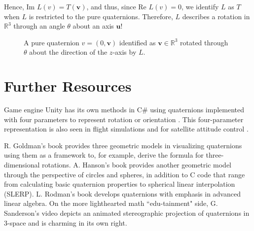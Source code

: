 \documentclass[12pt]{article}
\theoremstyle{plain}
\theoremstyle{definition}
\begin{document}
Hence, Im $L(v) = T(\textbf{v})$, and thus, since Re $L(v)=0$, we identify $L$ as $T$ when $L$ is restricted to the pure quaternions. Therefore, $L$ describes a rotation in $\mathbb{R}^3$ through an angle $\theta$ about an axis $\textbf{u}$!

\begin{figure}[h]
    \centering
    \caption{A pure quaternion $v=(0,\textbf{v})$ identified as $\textbf{v}\in\mathbb{R}^3$ rotated through $\theta$ about the direction of the $z$-axis by $L$.}
    \label{fig:quatRotL}
\end{figure}

\section{Further Resources}
Game engine Unity has its own methods in C\# using quaternions  implemented with four parameters to represent rotation or orientation \cite{unity}. This four-parameter representation is also seen in flight simulations and for satellite attitude control \cite{kristiansen, terze}.

R. Goldman's book \cite{goldman} provides three geometric models in visualizing quaternions using them as a framework to, for example, derive the formula for three-dimensional rotations. A. Hanson's book \cite{hanson} provides another geometric model through the perspective of circles and spheres, in addition to C code that range from calculating basic quaternion properties to spherical linear interpolation (SLERP). L. Rodman's book \cite{rodman} develops quaternions with emphasis in advanced linear algebra. On the more lighthearted math ``edu-tainment" side, G. Sanderson's video \cite{sanderson} depicts an animated stereographic projection of quaternions in 3-space and is charming in its own right. 


\nocite{*}
\printbibliography
\end{document}
